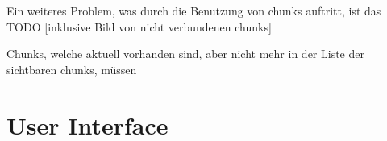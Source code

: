 Ein weiteres Problem, was durch die Benutzung von chunks auftritt, ist das TODO [inklusive Bild von nicht verbundenen chunks]


Chunks, welche aktuell vorhanden sind, aber nicht mehr in der Liste der sichtbaren chunks, müssen 


\section{User Interface}
